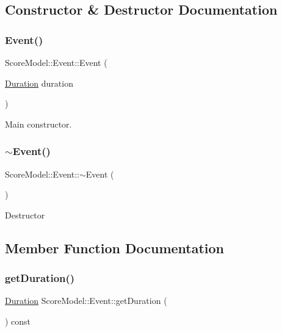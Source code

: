 \subsection{Constructor \& Destructor Documentation}
\mbox{\label{classScoreModel_1_1Event_af639f7bb1366a3f8790da5ac2ef795fc}} 
\subsubsection{\texorpdfstring{Event()}{Event()}}
{\footnotesize\ttfamily Score\+Model\+::\+Event\+::\+Event (\begin{DoxyParamCaption}\item[{\mbox{\hyperlink{classScoreModel_1_1Duration}{Duration}}}]{duration }\end{DoxyParamCaption})}

Main constructor. \mbox{\label{classScoreModel_1_1Event_a028708f328e5508208809b788b3498e2}} 
\subsubsection{\texorpdfstring{$\sim$Event()}{~Event()}}
{\footnotesize\ttfamily Score\+Model\+::\+Event\+::$\sim$\+Event (\begin{DoxyParamCaption}{ }\end{DoxyParamCaption})}

Destructor 

\subsection{Member Function Documentation}
\mbox{\label{classScoreModel_1_1Event_a6dd98760396d0900719f2637ec27371a}} 
\subsubsection{\texorpdfstring{getDuration()}{getDuration()}}
{\footnotesize\ttfamily \mbox{\hyperlink{classScoreModel_1_1Duration}{Duration}} Score\+Model\+::\+Event\+::get\+Duration (\begin{DoxyParamCaption}{ }\end{DoxyParamCaption}) const\hspace{0.3cm}{\ttfamily [inline]}}

